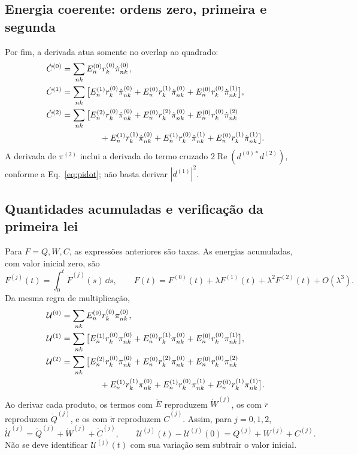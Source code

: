 \subsection{Energia coerente: ordens zero, primeira e segunda}
Por fim, a derivada atua somente no overlap ao quadrado:
\begin{align}
 \dot C^{(0)}
 &=\sum_{nk}E_n^{(0)}r_k^{(0)}\dot\pi_{nk}^{(0)},\label{eq:C0}\\
 \dot C^{(1)}
 &=\sum_{nk}\big[
 E_n^{(1)}r_k^{(0)}\dot\pi_{nk}^{(0)}
 +E_n^{(0)}r_k^{(1)}\dot\pi_{nk}^{(0)}
 +E_n^{(0)}r_k^{(0)}\dot\pi_{nk}^{(1)}\big],\label{eq:C1}\\
 \dot C^{(2)}
 &=\sum_{nk}\big[
 E_n^{(2)}r_k^{(0)}\dot\pi_{nk}^{(0)}
 +E_n^{(0)}r_k^{(2)}\dot\pi_{nk}^{(0)}
 +E_n^{(0)}r_k^{(0)}\dot\pi_{nk}^{(2)}\nonumber\\
 &\hspace{16mm}
 +E_n^{(1)}r_k^{(1)}\dot\pi_{nk}^{(0)}
 +E_n^{(1)}r_k^{(0)}\dot\pi_{nk}^{(1)}
 +E_n^{(0)}r_k^{(1)}\dot\pi_{nk}^{(1)}\big].
 \label{eq:C2}
\end{align}
A derivada de $\pi^{(2)}$ inclui a derivada do termo cruzado
$2\operatorname{Re}(d^{(0)*}d^{(2)})$, conforme a
Eq.~\eqref{eq:pidot}; não basta derivar $|d^{(1)}|^2$.

\subsection{Quantidades acumuladas e verificação da primeira lei}
Para $F=Q,W,C$, as expressões anteriores são taxas. As energias
acumuladas, com valor inicial zero, são
\begin{equation}
 F^{(j)}(t)=\int_0^t\dot F^{(j)}(s)\,\dd s,\qquad
 F(t)=F^{(0)}(t)+\lambda F^{(1)}(t)
                    +\lambda^2F^{(2)}(t)+O(\lambda^3).
 \label{eq:integrated}
\end{equation}
Da mesma regra de multiplicação,
\begin{align}
 \mathcal U^{(0)}
 &=\sum_{nk}E_n^{(0)}r_k^{(0)}\pi_{nk}^{(0)},\nonumber\\
 \mathcal U^{(1)}
 &=\sum_{nk}\big[E_n^{(1)}r_k^{(0)}\pi_{nk}^{(0)}
 +E_n^{(0)}r_k^{(1)}\pi_{nk}^{(0)}
 +E_n^{(0)}r_k^{(0)}\pi_{nk}^{(1)}\big],\nonumber\\
 \mathcal U^{(2)}
 &=\sum_{nk}\big[E_n^{(2)}r_k^{(0)}\pi_{nk}^{(0)}
 +E_n^{(0)}r_k^{(2)}\pi_{nk}^{(0)}
 +E_n^{(0)}r_k^{(0)}\pi_{nk}^{(2)}\nonumber\\
 &\hspace{16mm}+E_n^{(1)}r_k^{(1)}\pi_{nk}^{(0)}
 +E_n^{(1)}r_k^{(0)}\pi_{nk}^{(1)}
 +E_n^{(0)}r_k^{(1)}\pi_{nk}^{(1)}\big].
 \label{eq:Ucoeff}
\end{align}
Ao derivar cada produto, os termos com $\dot E$ reproduzem
$\dot W^{(j)}$, os com $\dot r$ reproduzem $\dot Q^{(j)}$,
e os com $\dot\pi$ reproduzem $\dot C^{(j)}$.
Assim, para $j=0,1,2$,
\begin{equation}
 \boxed{\dot{\mathcal U}^{(j)}
 =\dot Q^{(j)}+\dot W^{(j)}+\dot C^{(j)},\qquad
 \mathcal U^{(j)}(t)-\mathcal U^{(j)}(0)
 =Q^{(j)}+W^{(j)}+C^{(j)}.}
 \label{eq:orderlaw}
\end{equation}
Não se deve identificar $\mathcal U^{(j)}(t)$ com sua variação
sem subtrair o valor inicial.

